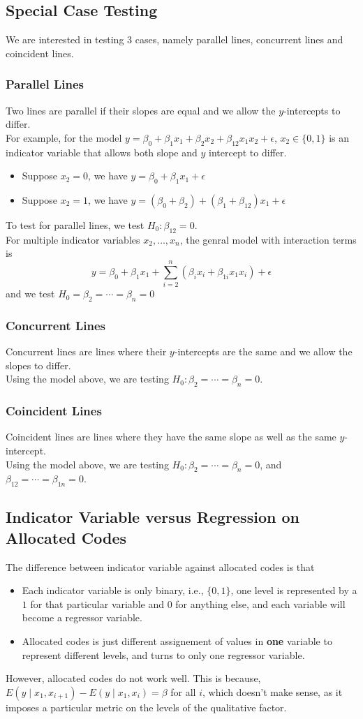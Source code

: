 \documentclass[11pt]{article}
\theoremstyle{definition}
\begin{document}
\subsection{Special Case Testing}
We are interested in testing 3 cases, namely parallel lines, concurrent lines and coincident lines.
\subsubsection{Parallel Lines}
Two lines are parallel if their slopes are equal and we allow the $y$-intercepts to differ.\\
For example, for the model $y=\beta_0+\beta_1x_1+\beta_2x_2+\beta_{12}x_1x_2+\epsilon$, $x_2\in\{0,1\}$ is an indicator variable that allows both slope and $y$ intercept to differ. 
\begin{itemize}
  \item Suppose $x_2=0$, we have $y=\beta_0+\beta_1x_1+\epsilon$
  \item Suppose $x_2=1$, we have $y=(\beta_0+\beta_2)+(\beta_1+\beta_{12})x_1+\epsilon$
\end{itemize}
To test for parallel lines, we test $H_0:\beta_{12}=0$.\\
For multiple indicator variables $x_2,\ldots, x_n$, the genral model with interaction terms is
\[
y=\beta_0+\beta_1x_1+\sum_{i=2}^n (\beta_ix_i+\beta_{1i}x_1x_i)+\epsilon
\]
and we test $H_0=\beta_2=\cdots=\beta_n=0$
\subsubsection{Concurrent Lines}
Concurrent lines are lines where their $y$-intercepts are the same and we allow the slopes to differ.\\
Using the model above, we are testing $H_0:\beta_2=\cdots=\beta_n=0$.
\subsubsection{Coincident Lines}
Coincident lines are lines where they have the same slope as well as the same $y$-intercept.\\
Using the model above, we are testing $H_0:\beta_2=\cdots=\beta_n=0$, and $\beta_{12}=\cdots=\beta_{1n}=0$.
\subsection{Indicator Variable versus Regression on Allocated Codes}
The difference between indicator variable against allocated codes is that
\begin{itemize}
  \item Each indicator variable is only binary, i.e., $\{0,1\}$, one level is represented by a $1$ for that particular variable and $0$ for anything else, and each variable will become a regressor variable.
  \item Allocated codes is just different assignement of values in \textbf{one} variable to represent different levels, and turns to only one regressor variable.
\end{itemize}
However, allocated codes do not work well. This is because, $E(y\mid x_1,x_{i+1})-E(y\mid x_1,x_i)=\beta$ for all $i$, which doesn't make sense, as it imposes a particular metric on the levels of the qualitative factor.
\end{document}
